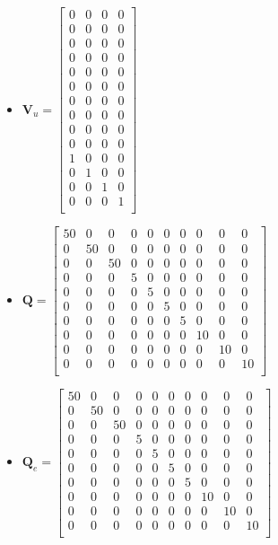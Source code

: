 \documentclass{thesisreport}
\begin{document}
\begin{multicols}{2}
\begin{itemize}
	\item $\bm{V}_u = \begin{bmatrix}
	0 & 0 & 0 & 0 \\
	0 & 0 & 0 & 0 \\
	0 & 0 & 0 & 0 \\
	0 & 0 & 0 & 0 \\
	0 & 0 & 0 & 0 \\
	0 & 0 & 0 & 0 \\
	0 & 0 & 0 & 0 \\
	0 & 0 & 0 & 0 \\
	0 & 0 & 0 & 0 \\
	0 & 0 & 0 & 0 \\
	1 & 0 & 0 & 0 \\
	0 & 1 & 0 & 0 \\
	0 & 0 & 1 & 0 \\
	0 & 0 & 0 & 1 \\
	\end{bmatrix}$
\end{itemize}
\columnbreak
\begin{itemize}
	\item $\bm{Q} = \begin{bmatrix}
	50 & 0 & 0 & 0 & 0 & 0 & 0 & 0 & 0 & 0 \\
	0 & 50 & 0 & 0 & 0 & 0 & 0 & 0 & 0 & 0 \\
	0 & 0 & 50 & 0 & 0 & 0 & 0 & 0 & 0 & 0 \\
	0 & 0 & 0 & 5 & 0 & 0 & 0 & 0 & 0 & 0 \\
	0 & 0 & 0 & 0 & 5 & 0 & 0 & 0 & 0 & 0 \\
	0 & 0 & 0 & 0 & 0 & 5 & 0 & 0 & 0 & 0 \\
	0 & 0 & 0 & 0 & 0 & 0 & 5 & 0 & 0 & 0 \\
	0 & 0 & 0 & 0 & 0 & 0 & 0 & 10 & 0 & 0 \\
	0 & 0 & 0 & 0 & 0 & 0 & 0 & 0 & 10 & 0 \\
	0 & 0 & 0 & 0 & 0 & 0 & 0 & 0 & 0 & 10 \\
	\end{bmatrix}$
	
	\item $\bm{Q}_e = \begin{bmatrix}
	50 & 0 & 0 & 0 & 0 & 0 & 0 & 0 & 0 & 0 \\
	0 & 50 & 0 & 0 & 0 & 0 & 0 & 0 & 0 & 0 \\
	0 & 0 & 50 & 0 & 0 & 0 & 0 & 0 & 0 & 0 \\
	0 & 0 & 0 & 5 & 0 & 0 & 0 & 0 & 0 & 0 \\
	0 & 0 & 0 & 0 & 5 & 0 & 0 & 0 & 0 & 0 \\
	0 & 0 & 0 & 0 & 0 & 5 & 0 & 0 & 0 & 0 \\
	0 & 0 & 0 & 0 & 0 & 0 & 5 & 0 & 0 & 0 \\
	0 & 0 & 0 & 0 & 0 & 0 & 0 & 10 & 0 & 0 \\
	0 & 0 & 0 & 0 & 0 & 0 & 0 & 0 & 10 & 0 \\
	0 & 0 & 0 & 0 & 0 & 0 & 0 & 0 & 0 & 10 \\
	\end{bmatrix}$
	

\end{itemize}
\end{multicols}
\end{document}
